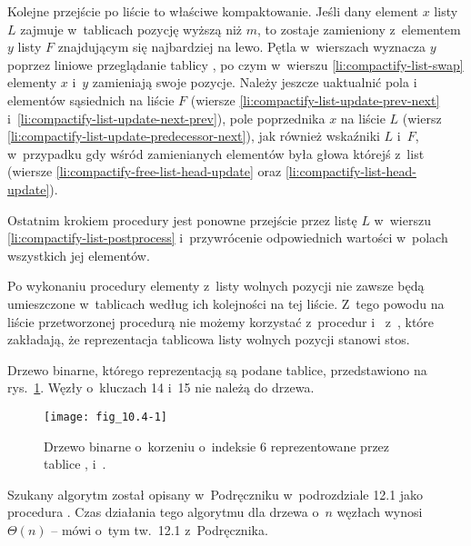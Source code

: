 Kolejne przejście po liście to właściwe kompaktowanie.
Jeśli dany element $x$ listy $L$ zajmuje w~tablicach pozycję wyższą niż $m$, to zostaje zamieniony z~elementem $y$ listy $F$ znajdującym się najbardziej na lewo.
Pętla  w~wierszach \doubledash{\ref{li:compactify-list-while2-begin}}{\ref{li:compactify-list-while2-end}} wyznacza $y$ poprzez liniowe przeglądanie tablicy , po czym w~wierszu \ref{li:compactify-list-swap} elementy $x$ i~$y$ zamieniają swoje pozycje.
Należy jeszcze uaktualnić pola  i~ elementów sąsiednich na liście $F$ (wiersze \ref{li:compactify-list-update-prev-next} i~\ref{li:compactify-list-update-next-prev}), pole  poprzednika $x$ na liście $L$ (wiersz \ref{li:compactify-list-update-predecessor-next}), jak również wskaźniki $L$ i~$F$, w~przypadku gdy wśród zamienianych elementów była głowa którejś z~list (wiersze \ref{li:compactify-free-list-head-update} oraz \ref{li:compactify-list-head-update}).

Ostatnim krokiem procedury jest ponowne przejście przez listę $L$ w~wierszu \ref{li:compactify-list-postprocess} i~przywrócenie odpowiednich wartości w~polach  wszystkich jej elementów.

Po wykonaniu procedury elementy z~listy wolnych pozycji nie zawsze będą umieszczone w~tablicach według ich kolejności na tej liście.
Z~tego powodu na liście przetworzonej procedurą  nie możemy korzystać z~procedur  i~ z~, które zakładają, że reprezentacja tablicowa listy wolnych pozycji stanowi stos.


\exercise %
Drzewo binarne, którego reprezentacją są podane tablice, przedstawiono na rys.\ \ref{fig:10.4-1}.
Węzły o~kluczach 14 i~15 nie należą do drzewa.
\begin{figure}[ht]
	\begin{center}
		\texttt{[image: fig\_10.4-1]}
	\end{center}
	\caption{Drzewo binarne o~korzeniu o~indeksie 6 reprezentowane przez tablice ,  i~.} \label{fig:10.4-1}
\end{figure}

\exercise %
Szukany algorytm został opisany w~Podręczniku w~podrozdziale 12.1 jako procedura .
Czas działania tego algorytmu dla drzewa o~$n$ węzłach wynosi $\Theta(n)$ -- mówi o~tym tw.\ 12.1 z~Podręcznika.


